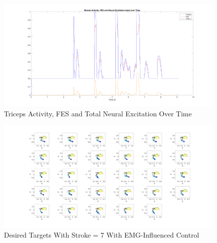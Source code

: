 \begin{figure}[h!]
\centering
\includegraphics[width=\textwidth]{Pictures/Results/Controller/FESMuscleExcitations.png}
\caption{Triceps Activity, FES and Total Neural Excitation Over Time} 
\end{figure}

\newpage
\begin{landscape} %
  \begin{figure}[h!]
    \centering
    \includegraphics[width=1.9\textwidth]{Pictures/Results/Controller/Stroke29positions.png}
    \caption{Desired Targets With Stroke = 7 With EMG-Influenced Control} 
  \end{figure}
\end{landscape} %